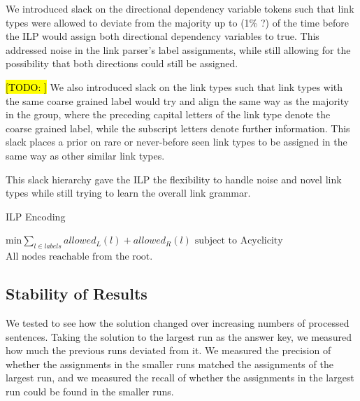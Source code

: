\documentclass[11pt]{article}
\newcommand{\Note}[1]{}
\renewcommand{\Note}[1]{\hl{[#1]}}  %
\newcommand{\TODO}[1]{\Note{TODO: #1}}
\begin{document}
We introduced slack on the directional dependency variable tokens such that link types were allowed to deviate from the majority up to (1\% ?) of the time before the ILP would assign both directional dependency variables to true. This addressed noise in the link parser's label assignments, while still allowing for the possibility that both directions could still be assigned.

\TODO{} We also introduced slack on the link types such that link types with the same coarse grained label would try and align the same way as the majority in the group, where the preceding capital letters of the link type denote the coarse grained label, while the subscript letters denote further information. This slack places a prior on rare or never-before seen link types to be assigned in the same way as other similar link types.

This slack hierarchy gave the ILP the flexibility to handle noise and novel link types while still trying to learn the overall link grammar.




\begin{algorithm}
\caption{ILP Encoding}\label{ILP}
\begin{algorithmic}[1]

\State $\text{min} \sum_{l \in labels} allowed_L(l) + allowed_R(l)$
\State $\text{subject to}$
\State $\text{Acyclicity}$
\State $\text{All nodes reachable from the root.}$

\end{algorithmic}
\end{algorithm}



\subsection{Stability of Results}
We tested to see how the solution changed over increasing numbers of processed sentences. 
Taking the solution to the largest run as the answer key, we measured how much the previous runs deviated from it. We measured the precision of whether the assignments in the smaller runs matched the assignments of the largest run, and we measured the recall of whether the assignments in the largest run could be found in the smaller runs. 
\end{document}
